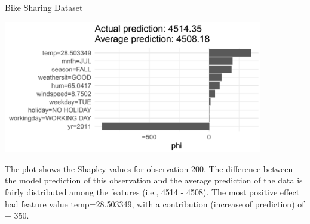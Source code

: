 \documentclass[11pt,compress,t,notes=noshow, xcolor=table]{beamer}
\begin{document}
\begin{vbframe}{Bike Sharing Dataset}

\begin{center}
\includegraphics[width=0.85\textwidth]{figure_man/bike-sharing03.png}
\end{center}

The plot shows the Shapley values for observation 200.
The difference between the model prediction of this observation and the average prediction of the data is fairly distributed among the features (i.e., 4514 - 4508).
The most positive effect had feature value temp=28.503349, with a contribution (increase of prediction) of + 350.
\end{vbframe}


\endlecture
\end{document}

